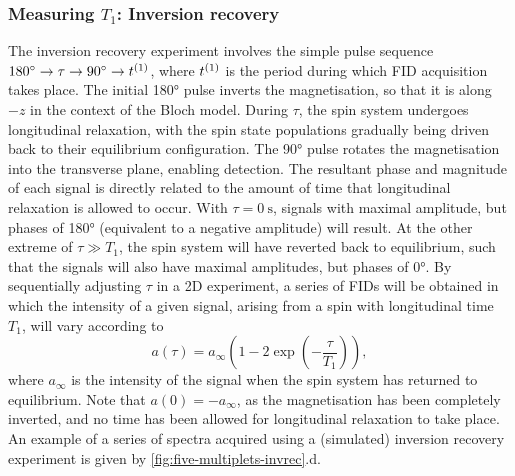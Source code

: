 \subsubsection{Measuring $T_1$: Inversion recovery}
\label{subsec:invrec}
The inversion recovery experiment involves the simple pulse sequence $\ang{180}
\rightarrow \tau \rightarrow \ang{90} \rightarrow t^{(1)}$, where $t^{(1)}$ is the
period during which \ac{FID} acquisition takes place. The initial
\ang{180} pulse inverts the magnetisation, so that it is along $-z$ in the
context of the Bloch model. During $\tau$, the spin system undergoes longitudinal
relaxation, with the spin state populations gradually being driven back to
their equilibrium configuration. The \ang{90} pulse rotates the magnetisation
into the transverse plane, enabling detection. The resultant phase and
magnitude of each signal is directly related to the amount of time that
longitudinal relaxation is allowed to occur. With $\tau = \qty{0}{\second}$,
signals with maximal amplitude, but phases of \ang{180} (equivalent to a
negative amplitude) will result. At the other extreme of $\tau \gg T_1$,
the spin system will have reverted
back to equilibrium, such that the signals will also have maximal amplitudes,
but phases of \ang{0}. By sequentially adjusting $\tau$ in a
\ac{2D} experiment, a series of \acp{FID} will be obtained in which the intensity
of a given signal, arising from a spin with longitudinal time $T_1$, will vary
according to
\begin{equation}
    a\left(\tau\right) = a_{\infty} \left( 1 - 2 \exp\left( -\frac{\tau}{T_1}\right) \right),
\end{equation}
where $a_{\infty}$ is the intensity of the signal when the spin system
has returned to equilibrium. Note that $a(0) = -a_{\infty}$, as the magnetisation
has been completely inverted, and no time has been allowed for longitudinal
relaxation to take place. An example of a series of spectra acquired using a
(simulated) inversion recovery experiment is given by
\cref{fig:five-multiplets-invrec}.d.


